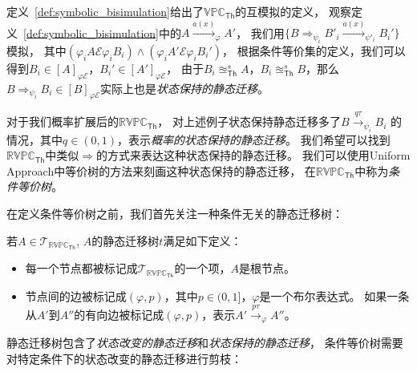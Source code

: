   定义~\ref{def:symbolic_bisimulation}给出了$\mathbb{VPC}_{\mathsf{Th}}$的互模拟的定义，
   观察定义~\ref{def:symbolic_bisimulation}中的$A\stackrel{a(x)}{\longrightarrow}_{\varphi} A'$，
   我们用$\{B\Rightarrow_{\psi_i}B'_i\stackrel{a(x)}{\longrightarrow}_{\psi'_i}B_i'\}$模拟，
   其中$(\varphi_i A\mathcal{E}\varphi_i B_i)\wedge(\varphi_i A'\mathcal{E}\varphi_i B_i')$，
   根据条件等价集的定义，我们可以得到$B_i\in [A]_{\varphi\mathcal{E}}$，$B_i'\in [A']_{\varphi \mathcal{E}}$，
   由于$B_i \approxeq_{\mathsf{Th}}^s A$，$B_i\approxeq_{\mathsf{Th}}^s B$，那么$B\Rightarrow_{\psi_i}B_i\in[B]_{\varphi\mathcal{E}}$实际上也是\textit{状态保持的静态迁移}。

   对于我们概率扩展后的$\mathbb{RVPC}_{\mathsf{Th}}$，
   对上述例子状态保持静态迁移多了$B\stackrel{q\tau}{\rightarrow}_{\psi_i} B_i$
   的情况，其中$q\in(0,1)$，表示\textit{概率的状态保持的静态迁移}。
   我们希望可以找到$\mathbb{RVPC}_{\mathsf{Th}}$中类似$\Rightarrow$的方式来表达这种状态保持的静态迁移。
   我们可以使用Uniform Approach中等价树的方法来刻画这种状态保持的静态迁移，
   在$\mathbb{RVPC}_{\mathsf{Th}}$中称为\textit{条件等价树}。

   在定义条件等价树之前，我们首先关注一种条件无关的静态迁移树：
\begin{definition}[静态迁移树]
   \label{def:silent_tree}
   若$A\in \mathcal{T}_{\mathbb{RVPC}_{\mathsf{Th}}}$,
   $A$的静态迁移树$t$满足如下定义：
   \begin{itemize}
   \item 每一个节点都被标记成$\mathcal{T}_{\mathbb{RVPC}_{\mathsf{Th}}}$的一个项，$A$是根节点。
   \item {
      节点间的边被标记成$(\varphi,p)$，其中$p\in(0,1]$，$\varphi$是一个布尔表达式。
      如果一条从$A'$到$A''$的有向边被标记成$(\varphi,p)$，表示$A'\stackrel{p\tau}{\rightarrow}_{\varphi} A''$。
   }
   \end{itemize}
\end{definition}

静态迁移树包含了\textit{状态改变的静态迁移}和\textit{状态保持的静态迁移}，
条件等价树需要对特定条件下的状态改变的静态迁移进行剪枝：


